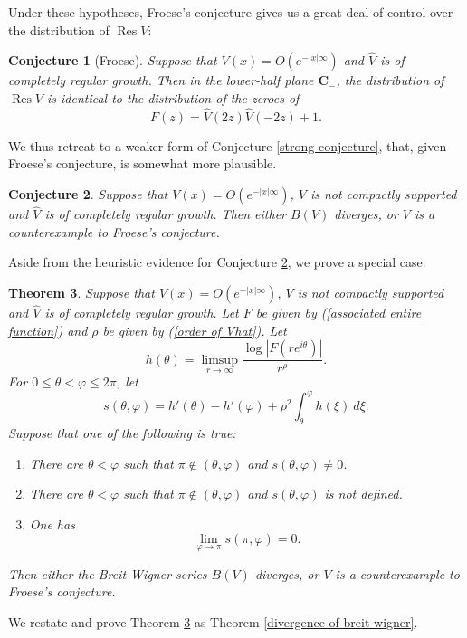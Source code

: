 \documentclass[12pt]{report}
\newcommand{\CC}{\mathbf{C}}
\DeclareMathOperator{\Res}{Res}
\newtheorem{theorem}{Theorem}[chapter]
\newtheorem{conjecture}[theorem]{Conjecture}
\theoremstyle{definition}
\begin{document}
Under these hypotheses, Froese's conjecture gives us a great deal of control over the distribution of $\Res V$:
\begin{conjecture}[Froese]
Suppose that $V(x) = O(e^{-|x|\infty})$ and $\hat V$ is of completely regular growth. Then in the lower-half plane $\CC_-$, the distribution  of $\Res V$ is identical to the distribution of the zeroes of
\begin{equation}
\label{associated entire function}
F(z) = \hat V(2z)\hat V(-2z) + 1.
\end{equation}
\end{conjecture}
We thus retreat to a weaker form of Conjecture \ref{strong conjecture}, that, given Froese's conjecture, is somewhat more plausible.
\begin{conjecture}
\label{weak conjecture}
Suppose that $V(x) = O(e^{-|x|\infty})$, $V$ is not compactly supported and $\hat V$ is of completely regular growth. Then either $B(V)$ diverges, or $V$ is a counterexample to Froese's conjecture.
\end{conjecture}

Aside from the heuristic evidence for Conjecture \ref{weak conjecture}, we prove a special case:
\begin{theorem}
\label{divergence of breit wigner, preliminary version}
Suppose that $V(x) = O(e^{-|x|\infty})$, $V$ is not compactly supported and $\hat V$ is of completely regular growth. Let $F$ be given by (\ref{associated entire function}) and $\rho$ be given by (\ref{order of Vhat}). Let
$$h(\theta) = \limsup_{r \to \infty} \frac{\log|F(re^{i\theta})|}{r^\rho}.$$
For $0 \leq \theta < \varphi \leq 2\pi$, let
$$s(\theta, \varphi) = h'(\theta) - h'(\varphi) + \rho^2\int_\theta^\varphi h(\xi) ~d\xi.$$
Suppose that one of the following is true:
\begin{enumerate}
\item There are $\theta < \varphi$ such that $\pi \notin (\theta, \varphi)$ and $s(\theta, \varphi) \neq 0$.
\item There are $\theta < \varphi$ such that $\pi \notin (\theta, \varphi)$ and $s(\theta, \varphi)$ is not defined.
\item One has
$$\lim_{\varphi \to \pi} s(\pi, \varphi) = 0.$$
\end{enumerate}
Then either the Breit-Wigner series $B(V)$ diverges, or $V$ is a counterexample to Froese's conjecture.
\end{theorem}
We restate and prove Theorem \ref{divergence of breit wigner, preliminary version} as Theorem \ref{divergence of breit wigner}.
\end{document}
